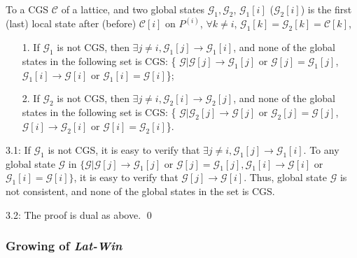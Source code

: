 \documentclass[12pt,journal,letterpaper,compsoc]{IEEEtran}
\begin{document}
 To a CGS $\mathcal{C}$ of a lattice, and two global states $\mathcal{G}_1, \mathcal{G}_2$, $\mathcal{G}_1[i]$ ($\mathcal{G}_2[i]$) is the first (last) local state after (before) $\mathcal{C}[i]$ on $P^{(i)}$, $\forall k\neq i$, $\mathcal{G}_1[k] = \mathcal{G}_2[k] = \mathcal{C}[k]$,
\begin{itemize}
    \item[1.] If $\mathcal{G}_1$ is not CGS, then $\exists j\neq i, \mathcal{G}_1[j] \rightarrow \mathcal{G}_1[i]$, and none of the global states in the following set is CGS:
        \{ $\mathcal{G} | \mathcal{G}[j]\rightarrow \mathcal{G}_1[j]$ or $\mathcal{G}[j] = \mathcal{G}_1[j]$, $\mathcal{G}_1[i]\rightarrow \mathcal{G}[i]$ or $\mathcal{G}_1[i] = \mathcal{G}[i]$\};
    \item[2.] If $\mathcal{G}_2$ is not CGS, then $\exists j\neq i, \mathcal{G}_2[i] \rightarrow \mathcal{G}_2[j]$, and none of the global states in the following set is CGS:
        \{ $\mathcal{G} | \mathcal{G}_2[j]\rightarrow \mathcal{G}[j]$ or $\mathcal{G}_2[j] = \mathcal{G}[j]$, $\mathcal{G}[i]\rightarrow \mathcal{G}_2[i]$ or $\mathcal{G}[i] = \mathcal{G}_2[i]$\}.
\end{itemize}


3.1: If $\mathcal{G}_1$ is not CGS, it is easy to verify that $\exists j\neq i, \mathcal{G}_1[j] \rightarrow \mathcal{G}_1[i]$. To any global state $\mathcal{G}$ in $\{\mathcal{G} | \mathcal{G}[j]\rightarrow \mathcal{G}_1[j]$ or $\mathcal{G}[j] = \mathcal{G}_1[j], \mathcal{G}_1[i]\rightarrow \mathcal{G}[i]$ or $\mathcal{G}_1[i] = \mathcal{G}[i]\}$, it is easy to verify that $\mathcal{G}[j] \rightarrow \mathcal{G}[i]$. Thus, global state $\mathcal{G}$ is not consistent, and none of the global states in the set is CGS.

3.2: The proof is dual as above. \qed\\

\subsubsection{Growing of {\it Lat-Win}}
\end{document}
